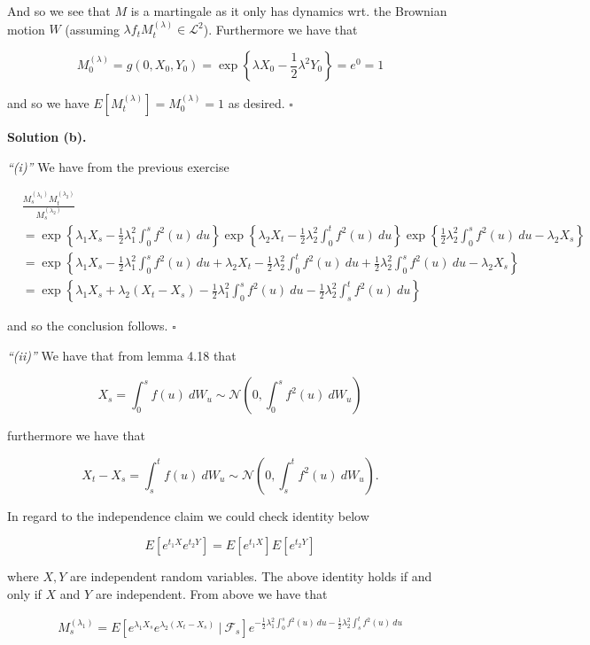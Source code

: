 \documentclass[
]{article}
\begin{document}
And so we see that \(M\) is a martingale as it only has dynamics wrt.
the Brownian motion \(W\) (assuming
\(\lambda f_tM_t^{(\lambda)}\in\mathcal{L}^2\)). Furthermore we have
that

\[
M_0^{(\lambda)}=g(0,X_0,Y_0)=\exp\left\{\lambda X_0-\frac{1}{2}\lambda ^2 Y_0\right\}=e^0=1
\]

and so we have \(E[M_t^{(\lambda)}]=M_0^{(\lambda)}=1\) as desired.
\(\square\)

\textbf{Solution (b).}

\emph{``(i)''} We have from the previous exercise

\begin{align*}
&\frac{M^{(\lambda_1)}_sM^{(\lambda_2)}_t}{M^{(\lambda_2)}_s}\\
&=\exp\left\{\lambda_1 X_s-\frac{1}{2}\lambda_1^2\int_0^s f^2(u)\ du\right\}\exp\left\{\lambda_2 X_t-\frac{1}{2}\lambda_2^2\int_0^t f^2(u)\ du\right\}\exp\left\{\frac{1}{2}\lambda_2^2\int_0^s f^2(u)\ du-\lambda_2 X_s\right\}\\
&=\exp\left\{\lambda_1 X_s-\frac{1}{2}\lambda_1^2\int_0^s f^2(u)\ du+\lambda_2 X_t-\frac{1}{2}\lambda_2^2\int_0^t f^2(u)\ du+\frac{1}{2}\lambda_2^2\int_0^s f^2(u)\ du-\lambda_2 X_s\right\}\\
&=\exp\left\{\lambda_1 X_s+\lambda_2 (X_t-X_s)-\frac{1}{2}\lambda_1^2\int_0^s f^2(u)\ du-\frac{1}{2}\lambda_2^2\int_s^t f^2(u)\ du\right\}
\end{align*}

and so the conclusion follows. \(\square\)

\emph{``(ii)''} We have that from lemma 4.18 that

\[
X_s=\int_0^sf(u)\ dW_u\sim \mathcal{N}\left(0,\int_0^sf^2(u)\ dW_u\right)
\]

furthermore we have that

\[
X_t-X_s=\int_s^tf(u)\ dW_u\sim \mathcal{N}\left(0,\int_s^tf^2(u)\ dW_u\right).
\]

In regard to the independence claim we could check identity below

\[
E[e^{t_1X}e^{t_2 Y}]=E[e^{t_1X}]E[e^{t_2Y}]
\]

where \(X,Y\) are independent random variables. The above identity holds
if and only if \(X\) and \(Y\) are independent. From above we have that

\[
M_s^{(\lambda_1)}=E[e^{\lambda_1X_s}e^{\lambda_2(X_t-X_s)}\ \vert\ \mathcal{F}_s]e^{-\frac{1}{2}\lambda_1^2\int_0^s f^2(u)\ du-\frac{1}{2}\lambda_2^2\int_s^t f^2(u)\ du}
\]
\end{document}

